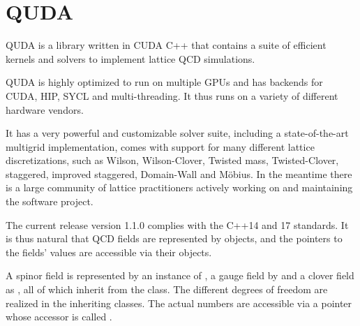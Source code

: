 \chapter{QUDA}
\label{ch:p1:quda}

QUDA \cite{QUDApaper} is a library written in CUDA C++ that contains a suite of efficient kernels and solvers to implement lattice QCD simulations.

QUDA is highly optimized to run on multiple GPUs and has backends for CUDA, HIP, SYCL and multi-threading. It thus runs on a variety of different hardware vendors.

It has a very powerful and customizable solver suite, including a state-of-the-art multigrid implementation, comes with support for many different lattice discretizations, such as Wilson, Wilson-Clover, Twisted mass, Twisted-Clover, staggered, improved staggered, Domain-Wall and Möbius. In the meantime there is a large community of lattice practitioners actively working on and maintaining the software project.

The current release version 1.1.0 complies with the C++14 and 17 standards. It is thus natural that QCD fields are represented by objects, and the pointers to the fields' values are accessible via their objects.


A spinor field is represented by an instance of , a gauge field by  and a clover field as , all of which inherit from the  class. The different degrees of freedom are realized in the inheriting classes. The actual numbers are accessible via a pointer whose accessor is called .

